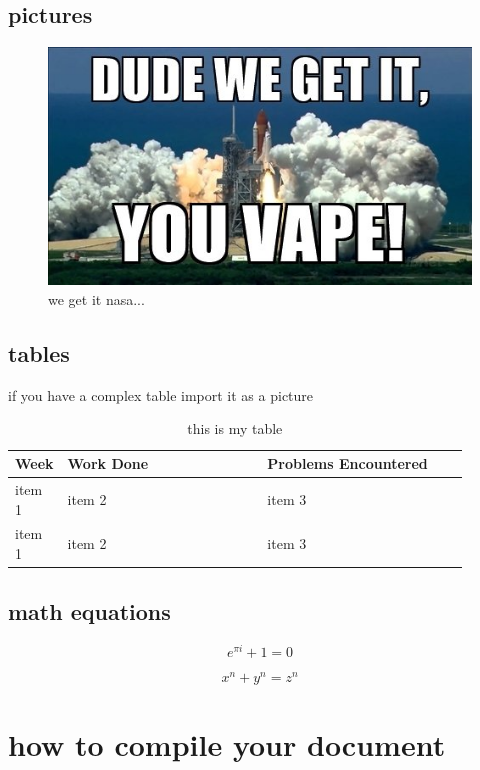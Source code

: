 \subsection{pictures}
\begin{figure}[hp]
	\centering
	\includegraphics[scale=.9]{meme.jpg}
	\caption{we get it nasa...}
\end{figure}

\subsection{tables}
if you have a complex table import it as a picture
\\%

\begin{table}[hp]
\centering
\begin{tabular} {l p{0.45\linewidth} p{0.45\linewidth}} \textbf{Week} & \textbf{Work Done} & \textbf{Problems Encountered}\\\hline
item 1 & item 2 & item 3 \\
item 1 & item 2 & item 3 \\
\end{tabular}
\caption{this is my table}
\end{table}

\subsection{math equations}

\[
e^{\pi i} + 1 = 0
\]

\[
x^n + y^n = z^n
\]

\section{how to compile your document}
